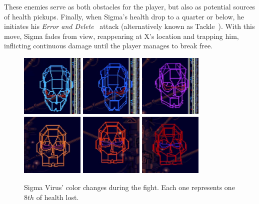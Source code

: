  These enemies serve as both obstacles for the player, but also as potential sources of health pickups. Finally, when Sigma's health drop to a quarter or below, he initiates his \emph{Error and Delete}~\cite{book:MH_field_guide} attack (alternatively known as Tackle~\cite{book:Compendium}). With this move, Sigma fades from view, reappearing at X's location and trapping him, inflicting continuous damage until the player manages to break free.

\begin{figure}[htp]
	\centering
		\includegraphics[height=3cm]{figures/X2/Hunter_stages/Sigma_virus_phase_2.png}
		\includegraphics[height=3cm]{figures/X2/Hunter_stages/Sigma_virus_phase_3.png}
		\includegraphics[height=3cm]{figures/X2/Hunter_stages/Sigma_virus_phase_4.png}\vspace{2pt}\\
		\includegraphics[height=3cm]{figures/X2/Hunter_stages/Sigma_virus_phase_5.png}
		\includegraphics[height=3cm]{figures/X2/Hunter_stages/Sigma_virus_phase_6.png}	
		\includegraphics[height=3cm]{figures/X2/Hunter_stages/Sigma_virus_phase_7.png}
	\caption{Sigma Virus' color changes during the fight. Each one represents one $8th$ of health lost.}
\end{figure}
